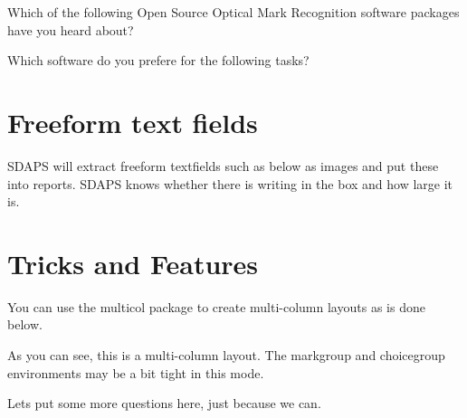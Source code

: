 \documentclass[
  english,
  ]{sdapsclassic}
\begin{document}
\begin{questionnaire}
\begin{Form}
\begin{choicequestion}[cols=3]{Which of the following Open Source
                                   Optical Mark Recognition software
                                   packages have you heard about?}
    \end{choicequestion}

    \begin{choicegroup}{Which software do you prefere for the following tasks?}
      \groupaddchoice{\LaTeX}

    \end{choicegroup}

    \section{Freeform text fields}

    SDAPS will extract freeform textfields such as below as images and put
    these into reports. SDAPS knows whether there is writing in the box and
    how large it is.


    \newpage
    \section{Tricks and Features}
    You can use the {\ttfamily multicol} package to create multi-column layouts
    as is done below.

    \begin{multicols}{2}

      As you can see, this is a multi-column layout. The {\ttfamily markgroup} and
      {\ttfamily choicegroup} environments may be a bit tight in this mode.

      Lets put some more questions here, just because we can.


\end{multicols}
\end{Form}
\end{questionnaire}
\end{document}
